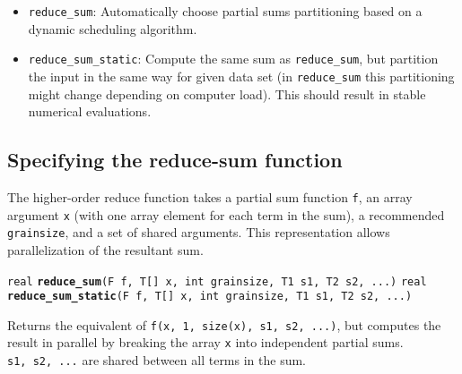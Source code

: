 \documentclass[
  10pt,
]{book}
\providecommand{\tightlist}{%
  \setlength{\itemsep}{0pt}\setlength{\parskip}{0pt}}
\begin{document}
\begin{itemize}
\tightlist
\item
  \texttt{reduce\_sum}: Automatically choose partial sums partitioning based on a dynamic
  scheduling algorithm.
\item
  \texttt{reduce\_sum\_static}: Compute the same sum as \texttt{reduce\_sum}, but partition
  the input in the same way for given data set (in \texttt{reduce\_sum} this partitioning
  might change depending on computer load). This should result in stable
  numerical evaluations.
\end{itemize}

\hypertarget{specifying-the-reduce-sum-function}{%
\subsection{Specifying the reduce-sum function}\label{specifying-the-reduce-sum-function}}

The higher-order reduce function takes a partial sum function \texttt{f}, an array argument \texttt{x}
(with one array element for each term in the sum), a recommended
\texttt{grainsize}, and a set of shared arguments. This representation allows
parallelization of the resultant sum.


\texttt{real} \textbf{\texttt{reduce\_sum}}\texttt{(F\ f,\ T{[}{]}\ x,\ int\ grainsize,\ T1\ s1,\ T2\ s2,\ ...)}\newline
\texttt{real} \textbf{\texttt{reduce\_sum\_static}}\texttt{(F\ f,\ T{[}{]}\ x,\ int\ grainsize,\ T1\ s1,\ T2\ s2,\ ...)}\newline

Returns the equivalent of \texttt{f(x,\ 1,\ size(x),\ s1,\ s2,\ ...)}, but computes
the result in parallel by breaking the array \texttt{x} into independent
partial sums. \texttt{s1,\ s2,\ ...} are shared between all terms in the sum.
\end{document}
